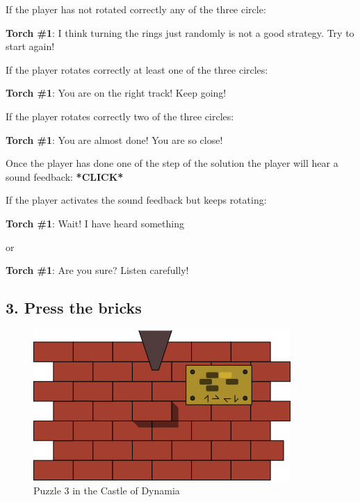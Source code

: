 If the player has not rotated correctly any of the three circle:

\textbf{Torch \#{}1}: I think turning the rings just randomly is not a good strategy. Try to start again!

If the player rotates correctly at least one of the three circles:

\textbf{Torch \#{}1}: You are on the right track! Keep going!

If the player rotates correctly two of the three circles:

\textbf{Torch \#{}1}: You are almost done! You are so close!

Once the player has done one of the step of the solution the player will hear a sound feedback: \textbf{*CLICK*}

If the player activates the sound feedback but keeps rotating:

\textbf{Torch \#{}1}: Wait! I have heard something

or

\textbf{Torch \#{}1}: Are you sure? Listen carefully!


\subsection{3. Press the bricks}

\begin{figure}[H]
  \centering
  \includegraphics[width=\textwidth]{Images/Puzzles/castleOfDynamia3}
  \caption{Puzzle 3 in the Castle of Dynamia}
\end{figure}


